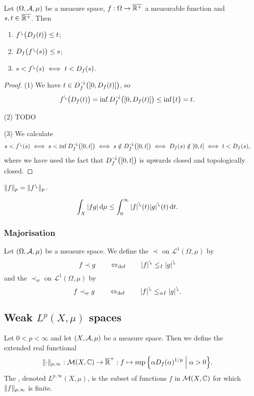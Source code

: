 \begin{proposition}
Let $\sSet{\Omega, \mathcal{A}, \mu}$ be a measure space, $f: \Omega\to \overline{\mathbb{R}^+}$ a measurable function and $s,t\in \overline{\mathbb{R}^+}$. Then
\begin{enumerate}
\item ${f}^{\ssearrow}\big(D_f(t)\big) \leq t$;
\item $D_f\big({f}^{\ssearrow}(s)\big) \leq s$;
\item $s < {f}^{\ssearrow}(s) \iff t < D_f(s)$.
\end{enumerate}
\end{proposition}
\begin{proof}
(1) We have $t\in D_f^\preimf\big(\interval{0,D_f(t)}\big)$, so
\[ \decRearrange{f}\big(D_f(t)\big) = \inf D_f^\preimf\big(\interval{0,D_f(t)}\big)\leq \inf\{t\} = t. \]

(2) TODO

(3) We calculate
\[ s < \decRearrange{f}(s) \iff s< \inf D_f^{\preimf}\big(\interval{0,t}\big) \iff s\notin D_f^{\preimf}\big(\interval{0,t}\big) \iff D_f(s) \notin \interval{0,t} \iff t < D_f(s), \]
where we have used the fact that $D_f^{\preimf}\big(\interval{0,t}\big)$ is upwards closed and topologically closed.
\end{proof}

\begin{proposition}
$\lVert f\rVert_p = \lVert{f}^{\ssearrow}\rVert_p$.
\end{proposition}

\begin{theorem}
\[ \int_{X}|fg|\operatorname{d \!}{\mu} \leq \int_{0}^{\infty}{|f|}^{\ssearrow}(t){|g|}^{\ssearrow}(t)\operatorname{d \!}{t}. \]
\end{theorem}

\subsubsection{Majorisation}
\begin{definition}
Let $\sSet{\Omega, \mathcal{A}, \mu}$ be a measure space. We define the  $\prec$ on $\mathcal{L}^1(\Omega, \mu)$ by
\[ f \prec g \quad\quad\Leftrightarrow_{\text{def}}\quad\quad {|f|}^{\ssearrow} \leq_I {|g|}^{\ssearrow} \]
and the  $\prec_w$ on $\mathcal{L}^1(\Omega, \mu)$ by
\[ f \prec_w g \quad\quad\Leftrightarrow_{\text{def}}\quad\quad {|f|}^{\ssearrow} \leq_{wI} {|g|}^{\ssearrow}. \]
\end{definition}

\subsection{Weak $L^p(X,\mu)$ spaces}
\begin{definition}
Let $0<p<\infty$ and let $\sSet{X,\mathcal{A}, \mu}$ be a measure space. Then we define the extended real functional
\[ \norm{\cdot}_{p,\infty}: \meas(X, \C)\to \overline{\R}^+: f\mapsto \sup\setbuilder{\alpha D_f(\alpha)^{1/p}}{\alpha > 0}. \]
The , denoted $L^{p,\infty}(X,\mu)$, is the subset of functions $f$ in $\operatorname{\mathcal{M}}(X, \mathbb{C})$ for which $\lVert f\rVert_{p,\infty}$ is finite.
\end{definition}

